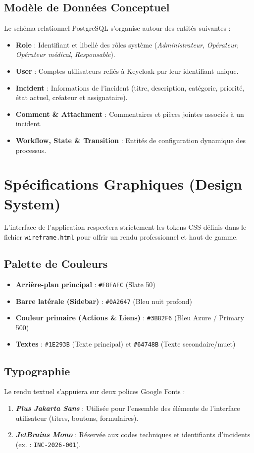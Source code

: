 \documentclass[12pt,a4paper]{article}
\begin{document}
\subsection{Modèle de Données Conceptuel}
Le schéma relationnel PostgreSQL s'organise autour des entités suivantes :
\begin{itemize}
    \item \textbf{Role} : Identifiant et libellé des rôles système (\textit{Administrateur}, \textit{Opérateur}, \textit{Opérateur médical}, \textit{Responsable}).
    \item \textbf{User} : Comptes utilisateurs reliés à Keycloak par leur identifiant unique.
    \item \textbf{Incident} : Informations de l'incident (titre, description, catégorie, priorité, état actuel, créateur et assignataire).
    \item \textbf{Comment \& Attachment} : Commentaires et pièces jointes associés à un incident.
    \item \textbf{Workflow, State \& Transition} : Entités de configuration dynamique des processus.
\end{itemize}

\section{Spécifications Graphiques (Design System)}
L'interface de l'application respectera strictement les tokens CSS définis dans le fichier \texttt{wireframe.html} pour offrir un rendu professionnel et haut de gamme.

\subsection{Palette de Couleurs}
\begin{itemize}
    \item \textbf{Arrière-plan principal} : \texttt{\#F8FAFC} (Slate 50)
    \item \textbf{Barre latérale (Sidebar)} : \texttt{\#0A2647} (Bleu nuit profond)
    \item \textbf{Couleur primaire (Actions \& Liens)} : \texttt{\#3B82F6} (Bleu Azure / Primary 500)
    \item \textbf{Textes} : \texttt{\#1E293B} (Texte principal) et \texttt{\#64748B} (Texte secondaire/muet)
\end{itemize}

\subsection{Typographie}
Le rendu textuel s'appuiera sur deux polices Google Fonts :
\begin{enumerate}
    \item \textbf{\textit{Plus Jakarta Sans}} : Utilisée pour l'ensemble des éléments de l'interface utilisateur (titres, boutons, formulaires).
    \item \textbf{\textit{JetBrains Mono}} : Réservée aux codes techniques et identifiants d'incidents (ex. : \texttt{INC-2026-001}).
\end{enumerate}
\end{document}

